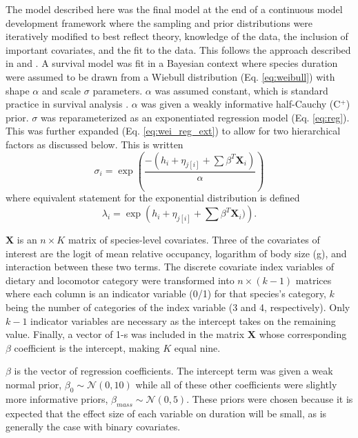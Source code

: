 \documentclass{article}
\begin{document}
The model described here was the final model at the end of a continuous model development framework where the sampling and prior distributions were iteratively modified to best reflect theory, knowledge of the data, the inclusion of important covariates, and the fit to the data. This follows the approach described in \cite{Gelman2007} and \cite{Gelman2013d}.
A survival model was fit in a Bayesian context where species duration were assumed to be drawn from a Wiebull distribution (Eq. \ref{eq:weibull}) with shape \(\alpha\) and scale \(\sigma\) parameters. \(\alpha\) was assumed constant, which is standard practice in survival analysis \cite{Klein2003}. \(\alpha\) was given a weakly informative half-Cauchy (C\(^{+}\)) prior. \(\sigma\) was reparameterized as an exponentiated regression model (Eq. \ref{eq:reg}). This was further expanded (Eq. \ref{eq:wei_reg_ext}) to allow for two hierarchical factors as discussed below. This is written
\begin{equation}
  \sigma_{i} = \exp\left(\frac{-(h_{i} + \eta_{j[i]} + \sum \beta^{T} \mathbf{X}_{i})}{\alpha}\right)
  \label{eq:wei_reg_ext}
\end{equation}
where equivalent statement for the exponential distribution is defined
\begin{equation}
  \lambda_{i} = \exp\left(h_{i} + \eta_{j[i]} + \sum \beta^{T} \mathbf{X}_{i})\right).
  \label{eq:exp_reg_ext}
\end{equation}

\(\mathbf{X}\) is an \(n \times K\) matrix of species-level covariates. Three of the covariates of interest are the logit of mean relative occupancy, logarithm of body size (g), and interaction between these two terms. The discrete covariate index variables of dietary and locomotor category were transformed into \(n \times (k - 1)\) matrices where each column is an indicator variable (0/1) for that species's category, \(k\) being the number of categories of the index variable (3 and 4, respectively). Only \(k - 1\) indicator variables are necessary as the intercept takes on the remaining value. Finally, a vector of 1-s was included in the matrix \(\mathbf{X}\) whose corresponding \(\beta\) coefficient is the intercept, making \(K\) equal nine.

\(\beta\) is the vector of regression coefficients. The intercept term was given a weak normal prior, \(\beta_{0} \sim \mathcal{N}(0, 10)\) while all of these other coefficients were slightly more informative priors, \(\beta_{mass} \sim \mathcal{N}(0, 5)\). These priors were chosen because it is expected that the effect size of each variable on duration will be small, as is generally the case with binary covariates. %
\end{document}
